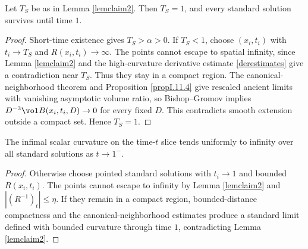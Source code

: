 \begin{lemma}
  \label{lem:kl-blow-up-time-standard-solution-standard-solutions-lemma}
 \label{lemclaim4}
Let $T_S$ be as in Lemma \ref{lemclaim2}. Then $T_S=1$, and every standard
solution survives until time $1$.
\end{lemma}
\begin{proof}
\sketch Short-time existence gives $T_S>\alpha>0$. If $T_S<1$, choose
$(x_i,t_i)$ with $t_i\to T_S$ and $R(x_i,t_i)\to\infty$. The points cannot
escape to spatial infinity, since Lemma \ref{lemclaim2} and the high-curvature
derivative estimate \eqref{derestimates} give a contradiction near $T_S$.
Thus they stay in a compact region. The canonical-neighborhood theorem and
Proposition \ref{propI.11.4} give rescaled ancient limits with vanishing
asymptotic volume ratio, so Bishop--Gromov implies
$D^{-3}\vol B(x_i,t_i,D)\to0$ for every fixed $D$. This contradicts smooth
extension outside a compact set. Hence $T_S=1$.
\end{proof}

\begin{lemma}
  \label{lem:kl-blow-up-time-standard-solution-standard-solutions-lemma-3}
 \label{scalarblowup}
The infimal scalar curvature on the time-$t$ slice tends uniformly to infinity
over all standard solutions as $t\to1^-$.
\end{lemma}
\begin{proof}
\sketch Otherwise choose pointed standard solutions with $t_i\to1$ and bounded
$R(x_i,t_i)$. The points cannot escape to infinity by Lemma \ref{lemclaim2} and
$|(R^{-1})_t|\leq\eta$. If they remain in a compact region, bounded-distance
compactness and the canonical-neighborhood estimates produce a standard limit
defined with bounded curvature through time $1$, contradicting Lemma
\ref{lemclaim2}.
\end{proof}

